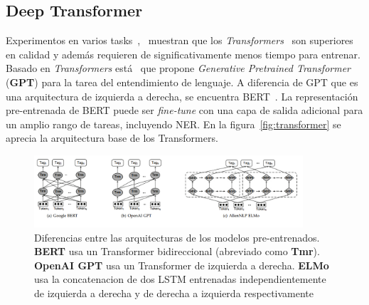 \subsection{Deep Transformer}


Experimentos en varios tasks~\cite{kitaev2018constituency},~\cite{liu2018generating} muestran que los \emph{Transformers}~\cite{vaswani2017attention} son superiores en calidad y adem\'as requieren de significativamente menos tiempo para entrenar. Basado en \emph{Transformers} est\'a~\cite{radford2018improving} que propone \emph{Generative Pretrained Transformer} (\textbf{GPT}) para la tarea del entendimiento de lenguaje. A diferencia de GPT que es una arquitectura de izquierda a derecha, se encuentra BERT~\cite{devlin2018bert}. La representaci\'on pre-entrenada de BERT puede ser \emph{fine-tune} con una capa de salida adicional para un amplio rango de tareas, incluyendo NER. En la figura~\ref{fig:transformer} se aprecia la arquitectura base de los Transformers.

\begin{figure}[H]
	\centering
	\includegraphics[width = 10cm]{Graphics/LM.png}
	\caption{Diferencias entre las arquitecturas de los modelos pre-entrenados. \textbf{BERT} usa un Transformer bidireccional (abreviado como \textbf{Tmr}). \textbf{OpenAI GPT} usa un Transformer de izquierda a derecha. \textbf{ELMo} usa la concatenacion de dos LSTM entrenadas independientemente de izquierda a derecha y de derecha a izquierda respectivamente}\label{fig:LM}
\end{figure}

